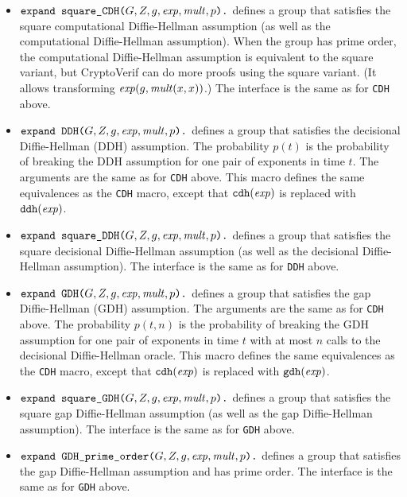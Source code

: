 \documentclass{article}
\begin{document}
\begin{itemize}
\item $\texttt{expand\ square\_CDH(}G, Z, g, \mathit{exp}, \mathit{mult},
  p\texttt{).}$ defines a group that satisfies the square
  computational Diffie-Hellman assumption (as well as the computational 
  Diffie-Hellman assumption). When the group has prime order,
  the computational Diffie-Hellman assumption is equivalent to the
  square variant, but CryptoVerif can do more proofs using the
  square variant. (It allows transforming $\mathit{exp}(g, \mathit{mult}(x,x))$.)
  The interface is the same as for \texttt{CDH} above.

\item $\texttt{expand\ DDH(}G, Z, g, \mathit{exp}, \mathit{mult},
  p\texttt{).}$ defines a group that satisfies the decisional
  Diffie-Hellman (DDH) assumption. The probability $p(t)$ is the probability of breaking the DDH assumption for one pair of exponents in time $t$. The arguments are the same as for
  \texttt{CDH} above. This macro defines the same equivalences
as the \texttt{CDH} macro, except that $\texttt{cdh}(\mathit{exp})$ is replaced
with $\texttt{ddh}(\mathit{exp})$.

\item $\texttt{expand\ square\_DDH(}G, Z, g, \mathit{exp}, \mathit{mult},
  p\texttt{).}$ defines a group that satisfies the square decisional
  Diffie-Hellman assumption (as well as the decisional
  Diffie-Hellman assumption). The interface is the same as for \texttt{DDH} above.

\item $\texttt{expand\ GDH(}G, Z, g, \mathit{exp}, \mathit{mult},
  p\texttt{).}$ defines a group that satisfies the gap
  Diffie-Hellman (GDH) assumption. The arguments are the same as for
  \texttt{CDH} above. The probability $p(t,n)$ is the probability of breaking
  the GDH assumption for one pair of exponents in time $t$ with at most $n$ calls to the decisional Diffie-Hellman oracle. This macro defines the same equivalences
as the \texttt{CDH} macro, except that $\texttt{cdh}(\mathit{exp})$ is replaced
with $\texttt{gdh}(\mathit{exp})$.

\item
  $\texttt{expand\ square\_GDH(}G, Z, g, \mathit{exp}, \mathit{mult},
  p\texttt{).}$
  defines a group that satisfies the square gap Diffie-Hellman
  assumption (as well as the gap Diffie-Hellman assumption). The
  interface is the same as for \texttt{GDH} above.

\item $\texttt{expand\ GDH\_prime\_order(}G, Z, g, \mathit{exp}, \mathit{mult},
  p\texttt{).}$ defines a group that satisfies the gap
  Diffie-Hellman assumption and has prime order. The interface is 
  the same as for \texttt{GDH} above.


\end{itemize}
\end{document}
